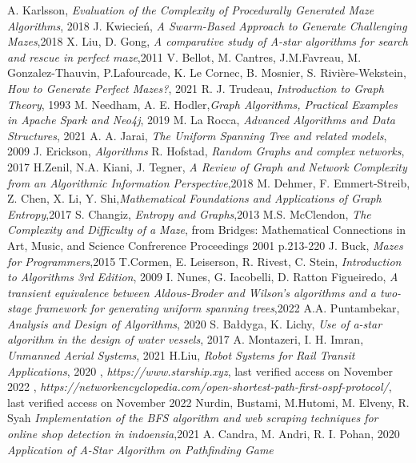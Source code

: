 
\begin{thebibliography}{100}
A. Karlsson, \emph{Evaluation of the Complexity of Procedurally Generated Maze Algorithms}, 2018
J. Kwiecień, \emph{A Swarm-Based Approach to Generate Challenging Mazes},2018
X. Liu, D. Gong, \emph{A comparative study of A-star algorithms for search and rescue in perfect maze},2011
V. Bellot, M. Cantres, J.M.Favreau, M. Gonzalez-Thauvin, P.Lafourcade, K. Le Cornec, B. Mosnier, S. Rivière-Wekstein,
\emph{How to Generate Perfect Mazes?}, 2021
R. J. Trudeau, \emph{Introduction to Graph Theory}, 1993
M. Needham, A. E. Hodler,\emph{Graph Algorithms, Practical Examples in Apache Spark and Neo4j}, 2019
M. La Rocca, \emph{Advanced Algorithms and Data Structures}, 2021 
A. A. Jarai, \emph{The Uniform Spanning Tree and related models}, 2009
 J. Erickson, \emph{Algorithms}
R. Hofstad, \emph{Random Graphs and complex networks}, 2017
H.Zenil, N.A. Kiani, J. Tegner, \emph{A Review of Graph and Network Complexity from an Algorithmic Information Perspective},2018
M. Dehmer, F. Emmert-Streib, Z. Chen, X. Li, Y. Shi,\emph{Mathematical Foundations and Applications of Graph Entropy},2017
S. Changiz, \emph{Entropy and Graphs},2013
M.S. McClendon, \emph{The Complexity and Difficulty of a Maze}, from Bridges: Mathematical Connections in Art, Music, and Science Confrerence Proceedings 2001 p.213-220
J. Buck, \emph{Mazes for Programmers},2015
T.Cormen, E. Leiserson, R. Rivest, C. Stein, \emph{Introduction to Algorithms 3rd Edition}, 2009
I. Nunes, G. Iacobelli, D. Ratton Figueiredo, \emph{A transient equivalence between Aldous-Broder and Wilson's algorithms and a two-stage framework for generating uniform spanning trees},2022
A.A. Puntambekar, \emph{Analysis and Design of Algorithms}, 2020 
S. Bałdyga, K. Lichy, \emph{Use of a-star algorithm in the design of water vessels}, 2017
A. Montazeri, I. H. Imran, \emph{Unmanned Aerial Systems}, 2021
H.Liu, \emph{Robot Systems for Rail Transit Applications}, 2020
, \emph{https://www.starship.xyz}, last verified access on November 2022
, \emph{https://networkencyclopedia.com/open-shortest-path-first-ospf-protocol/}, last verified access on November 2022
Nurdin, Bustami, M.Hutomi, M. Elveny, R. Syah \emph{Implementation of the BFS algorithm and web scraping techniques for online shop detection in indoensia},2021
 A. Candra, M. Andri, R. I. Pohan, 2020 \emph{Application of A-Star Algorithm on Pathfinding Game}




\end{thebibliography}
